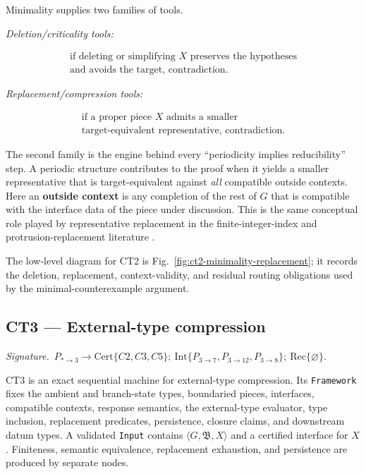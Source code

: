\documentclass[
  11pt,
]{article}
\theoremstyle{definition}
\newcommand{\ctsignature}[1]{\par\noindent\emph{Signature.}\ #1\par\medskip}
\newcommand{\ctcert}[1]{\mathrm{Cert}\{#1\}}
\newcommand{\ctint}[1]{\mathrm{Int}\{#1\}}
\newcommand{\ctrec}[1]{\mathrm{Rec}\{#1\}}
\newcommand{\ctnone}{\varnothing}
\begin{document}
Minimality supplies two families of tools.

\emph{Deletion/criticality tools:}

\[
\begin{gathered}
\text{if deleting or simplifying } X \text{ preserves the hypotheses}\\
\text{and avoids the target, contradiction.}
\end{gathered}
\]

\emph{Replacement/compression tools:}

\[
\begin{gathered}
\text{if a proper piece } X \text{ admits a smaller}\\
\text{target-equivalent representative, contradiction.}
\end{gathered}
\]

The second family is the engine behind every ``periodicity implies
reducibility'' step. A periodic structure contributes to the proof when
it yields a smaller representative that is target-equivalent against
\emph{all} compatible outside contexts. Here an \textbf{outside context}
is any completion of the rest of \(G\) that is compatible with the
interface data of the piece under discussion. This is the same
conceptual role played by representative replacement in the
finite-integer-index and protrusion-replacement literature
\citep{bodlaender-etal-2009-meta-kernelization, kim-etal-2012-protrusion, garnero-etal-2013-explicit-kernels, jansen-wulms-2016-lower-bounds}.

The low-level diagram for CT2 is Fig.~\ref{fig:ct2-minimality-replacement};
it records the deletion, replacement, context-validity, and residual
routing obligations used by the minimal-counterexample argument.



\subsection{CT3 --- External-type compression}\label{ct:3}\label{boundaried-pieces-and-external-types}
\ctsignature{\(P_{\ast\to3}\to \ctcert{C2,C3,C5};\ \ctint{P_{3\to7},P_{3\to12},P_{3\to8}};\ \ctrec{\ctnone}\).}

CT3 is an exact sequential machine for external-type compression.  Its
\texttt{Framework} fixes the ambient and branch-state types, boundaried pieces,
interfaces, compatible contexts, response semantics, the external-type
evaluator, type inclusion, replacement predicates, persistence, closure
claims, and downstream datum types.  A validated \texttt{Input} contains
\(\langle G,\mathfrak B,X\rangle\) and a certified interface for \(X\).
Finiteness, semantic equivalence, replacement exhaustion, and persistence are
produced by separate nodes.
\end{document}

